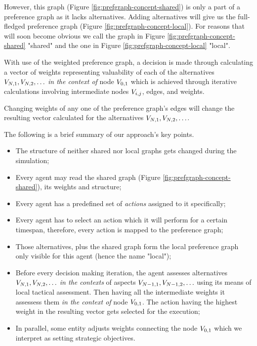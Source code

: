 However, this graph (Figure \ref{fig:prefgraph-concept-shared}) is only a part of a preference graph as it lacks
alternatives. Adding alternatives will give us the full-fledged preference graph (Figure
\ref{fig:prefgraph-concept-local}). For reasons that will soon become obvious we call the graph in Figure
\ref{fig:prefgraph-concept-shared} "shared" and the one in Figure \ref{fig:prefgraph-concept-local} "local".

With use of the weighted preference graph, a decision is made through calculating a vector of weights representing
valuability of each of the alternatives $V_{N,1}, V_{N,2},\ldots$ \textit{in the context of} node $V_{0,1}$ which is
achieved through iterative calculations involving intermediate nodes $V_{i,j}$, edges, and weights.

Changing weights of any one of the preference graph's edges will change the resulting vector calculated for the alternatives
$V_{N,1}, V_{N,2},\ldots$.

The following is a brief summary of our approach's key points.

\begin{itemize}
    \item The structure of neither shared nor local graphs gets changed during the simulation;
    \item Every agent may read the shared graph (Figure \ref{fig:prefgraph-concept-shared}), its weights and structure;
    \item Every agent has a predefined set of \textit{actions} assigned to it specifically;
    \item Every agent has to select an action which it will perform for a certain timespan, therefore, every action is
        mapped to the preference graph;
    \item Those alternatives, plus the shared graph form the local preference graph only visible for this agent (hence
        the name "local");
    \item Before every decision making iteration, the agent assesses alternatives $V_{N,1}, V_{N,2},\ldots$ \textit{in the contexts} of
        aspects $ V_{N-1,1}, V_{N-1,2}, \ldots $ using its means of local tactical assessment. Then having all the intermediate weights
        it assessess them \textit{in the context of} node $V_{0,1}$. The action having the highest weight in the
        resulting vector gets selected for the execution;
    \item In parallel, some entity adjusts weights connecting the node $V_{0,1}$ which we interpret as setting
        strategic objectives.
\end{itemize}

